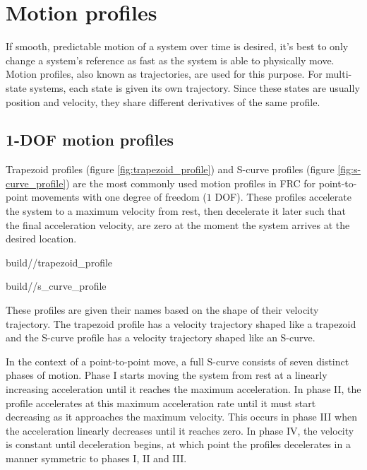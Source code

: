 
\chapter{Motion profiles}

If smooth, predictable motion of a \gls{system} over time is desired, it's best
to only change a \gls{system}'s \gls{reference} as fast as the \gls{system} is
able to physically move. Motion profiles, also known as trajectories, are used
for this purpose. For multi-state \glspl{system}, each \gls{state} is given its
own trajectory. Since these \glspl{state} are usually position and velocity,
they share different derivatives of the same profile.

\section{1-DOF motion profiles}
\label{sec:1_dof_motion_profiles}

Trapezoid profiles (figure \ref{fig:trapezoid_profile}) and S-curve profiles
(figure \ref{fig:s-curve_profile}) are the most commonly used motion profiles in
FRC for point-to-point movements with one degree of freedom ($1$ DOF). These
profiles accelerate the \gls{system} to a maximum velocity from rest, then
decelerate it later such that the final acceleration velocity, are zero at the
moment the \gls{system} arrives at the desired location.
\begin{bookfigure}
  \begin{minisvg}{2}{build/\partpath/trapezoid_profile}
    \caption{Trapezoid profile}
    \label{fig:trapezoid_profile}
  \end{minisvg}
  \hfill
  \begin{minisvg}{2}{build/\partpath/s_curve_profile}
    \caption{S-curve profile}
    \label{fig:s-curve_profile}
  \end{minisvg}
\end{bookfigure}

These profiles are given their names based on the shape of their velocity
trajectory. The trapezoid profile has a velocity trajectory shaped like a
trapezoid and the S-curve profile has a velocity trajectory shaped like an
S-curve.

In the context of a point-to-point move, a full S-curve consists of seven
distinct phases of motion. Phase I starts moving the \gls{system} from rest at a
linearly increasing acceleration until it reaches the maximum acceleration. In
phase II, the profile accelerates at this maximum acceleration rate until it
must start decreasing as it approaches the maximum velocity. This occurs in
phase III when the acceleration linearly decreases until it reaches zero. In
phase IV, the velocity is constant until deceleration begins, at which point the
profiles decelerates in a manner symmetric to phases I, II and III.

